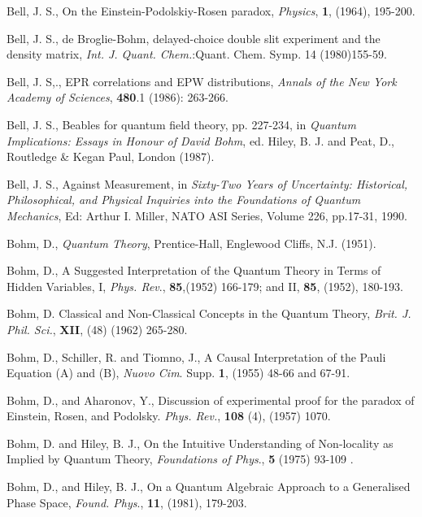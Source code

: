 \documentclass[11pt]{article}
\begin{document}
\begin{thebibliography}{99}


 Bell, J. S., On the Einstein-Podolskiy-Rosen paradox, {\em Physics}, {\bf 1}, (1964), 195-200.

 Bell, J. S., de Broglie-Bohm, delayed-choice double slit experiment and the density matrix, {\em Int. J. Quant. Chem.}:Quant. Chem. Symp. 14 (1980)155-59.

  Bell, J. S,., EPR correlations and EPW distributions, {\em Annals of the New York Academy of Sciences}, {\bf 480}.1 (1986): 263-266.  

 Bell, J. S., Beables for quantum field theory, pp. 227-234, in   {\em Quantum Implications: Essays in Honour of David Bohm}, ed. Hiley, B. J. and Peat, D., Routledge \& Kegan Paul, London (1987).

 Bell, J. S., Against Measurement, in {\em Sixty-Two Years of Uncertainty: Historical, Philosophical, and Physical Inquiries into the Foundations of Quantum Mechanics}, Ed: Arthur I. Miller, NATO ASI Series, Volume 226, pp.17-31, 1990.

 Bohm, D., {\em Quantum Theory}, Prentice-Hall, Englewood Cliffs, N.J. (1951).

 Bohm, D., A Suggested Interpretation of the Quantum Theory in Terms of Hidden Variables, I, {\em Phys. Rev}., {\bf 85},(1952) 166-179; and II, {\bf 85}, (1952), 180-193.

 Bohm, D.  Classical and Non-Classical Concepts in the Quantum Theory, {\em Brit. J. Phil.  Sci.}, {\bf XII},  (48) (1962) 265-280.

 Bohm, D., Schiller, R. and Tiomno, J., A Causal Interpretation of the Pauli Equation (A) and (B), {\em Nuovo Cim}. Supp. {\bf 1}, (1955) 48-66 and 67-91.

 Bohm, D., and  Aharonov, Y., Discussion of experimental proof for the paradox of Einstein, Rosen, and Podolsky. {\em Phys. Rev.}, {\bf 108} (4),  (1957) 1070.

  Bohm, D. and Hiley, B. J.,  On the Intuitive Understanding of Non-locality as Implied by Quantum Theory,   {\em Foundations of Phys}., {\bf 5} (1975) 93-109 .

 Bohm, D., and Hiley, B. J., On a Quantum Algebraic Approach to a Generalised Phase Space, {\em Found. Phys}., {\bf 11}, (1981), 179-203.


\end{thebibliography}
\end{document}
